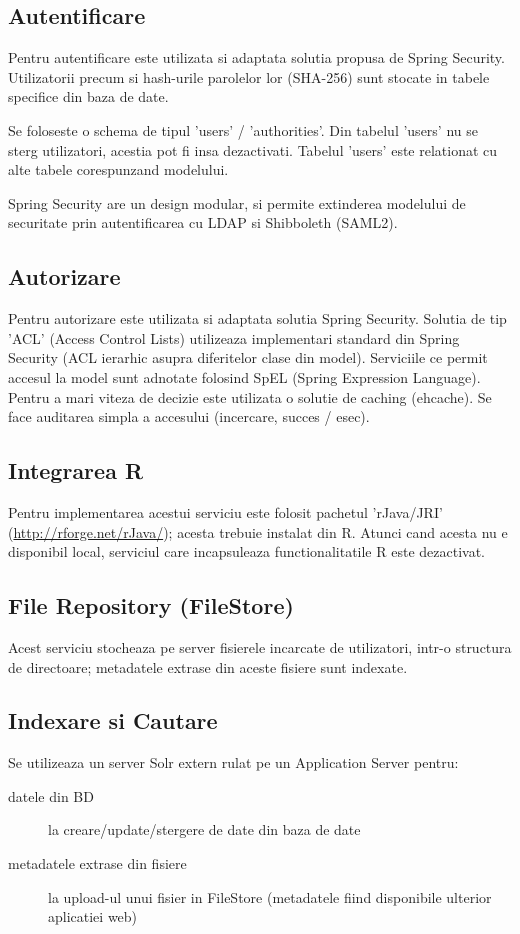 \subsection{Autentificare}
Pentru autentificare este utilizata si adaptata solutia propusa de Spring Security.
Utilizatorii precum si hash-urile parolelor lor (SHA-256) sunt stocate in
tabele specifice din baza de date.

Se foloseste o schema de tipul 'users' / 'authorities'.
Din tabelul 'users' nu se sterg utilizatori, acestia pot fi insa dezactivati.
Tabelul 'users' este relationat cu alte tabele corespunzand modelului.

Spring Security are un design modular, si permite extinderea modelului de
securitate prin autentificarea cu LDAP si Shibboleth (SAML2).

\subsection{Autorizare}
Pentru autorizare este utilizata si adaptata solutia Spring Security.
Solutia de tip 'ACL' (Access Control Lists) utilizeaza implementari standard din
Spring Security (ACL ierarhic asupra diferitelor clase din model). 
Serviciile ce permit accesul la model sunt adnotate folosind SpEL
(Spring Expression Language).
Pentru a mari viteza de decizie este utilizata o solutie de caching (ehcache). 
Se face auditarea simpla a accesului (incercare, succes / esec). 

\subsection{Integrarea R}
Pentru implementarea acestui serviciu este folosit pachetul 'rJava/JRI' (\url{http://rforge.net/rJava/}); 
acesta trebuie instalat din R.
Atunci cand acesta nu e disponibil local, serviciul care
incapsuleaza functionalitatile R este dezactivat.

\subsection{File Repository (FileStore)}
Acest serviciu stocheaza pe server fisierele incarcate de utilizatori, 
intr-o structura de directoare;
metadatele extrase din aceste fisiere sunt indexate.

\subsection{Indexare si Cautare}
Se utilizeaza un server Solr extern rulat pe un
Application Server pentru:
\begin{description}
\item[datele din BD] la creare/update/stergere de date din baza de
date
\item[metadatele extrase din fisiere] la upload-ul unui fisier
in FileStore (metadatele fiind disponibile ulterior aplicatiei web)
\end{description}

